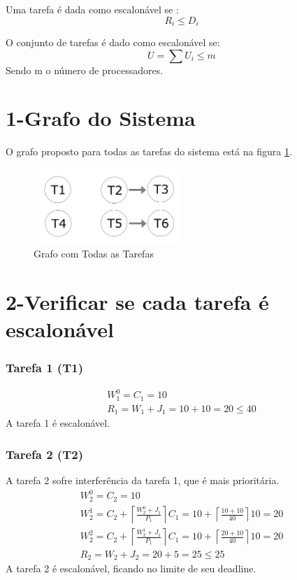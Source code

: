 \documentclass[12pt,a4paper]{article}
\begin{document}
Uma tarefa é dada como escalonável se :
\begin{equation}
R_i\leq D_i
\end{equation}

O conjunto de tarefas é dado como escalonável se:
\begin{equation}
U=\sum U_i \leq m
\end{equation}
Sendo m o número de processadores.

\section*{1-Grafo do Sistema}
O grafo proposto para todas as tarefas do sistema está na figura \ref{grafo}.

\begin{figure}[H]
\centering
\includegraphics[width=0.5\textwidth]{grafo_tarefas}
\caption{Grafo com Todas as Tarefas}
\label{grafo}
\end{figure}

\section*{2-Verificar se cada tarefa é escalonável}
\subsubsection*{Tarefa 1 (T1)}
\begin{gather*}
W_1^0 = C_1 = 10\\
R_1=W_1+J_1 = 10+10=20 \leq 40
\end{gather*}
A tarefa 1 é escalonável.
\subsubsection*{Tarefa 2 (T2)}
A tarefa 2 sofre interferência da tarefa 1, que é mais prioritária.
\begin{gather*}
W_2^0 = C_2 = 10 \\
W_2^1= C_2 + \left\lceil\frac{W_2^0+J_1}{P_1}\right\rceil C_1 = 10 + \left\lceil\frac{10+10}{40}\right\rceil  10 = 20 \\
W_2^2=C_2+\left\lceil\frac{W_2^1+J_1}{P_1}\right\rceil  C_1 = 10+\left\lceil\frac{20+10}{40}\right\rceil  10 = 20\\
R_2=W_2+J_2=20+5=25\leq 25
\end{gather*}
A tarefa 2 é escalonável, ficando no limite de seu deadline.
\end{document}
